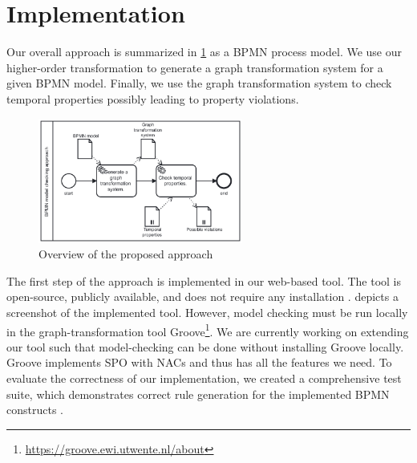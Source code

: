 \documentclass[submission, copyright, creativecommons]{eptcs}
\begin{document}
\section{Implementation} \label{sec:impl}
Our overall approach is summarized in \cref{fig:approach} as a BPMN process model.
We use our higher-order transformation to generate a graph transformation system for a given BPMN model.
Finally, we use the graph transformation system to check temporal properties possibly leading to property violations.

\begin{figure}[h!]
    \centering
    \includegraphics[width=0.6\textwidth]{images/full-approach.pdf}
    \caption{Overview of the proposed approach}
    \label{fig:approach}
\end{figure}

The first step of the approach is implemented in our web-based tool.
The tool is open-source, publicly available, and does not require any installation \cite{timkrauterArtifactsTERMGRAPH2022}.
 depicts a screenshot of the implemented tool.
However, model checking must be run locally in the graph-transformation tool Groove\footnote{\url{https://groove.ewi.utwente.nl/about}}.
We are currently working on extending our tool such that model-checking can be done without installing Groove locally.
Groove implements SPO with NACs and thus has all the features we need.
To evaluate the correctness of our implementation, we created a comprehensive test suite, which demonstrates correct rule generation for the implemented BPMN constructs \cite{timkrauterArtifactsTERMGRAPH2022}.
\end{document}
